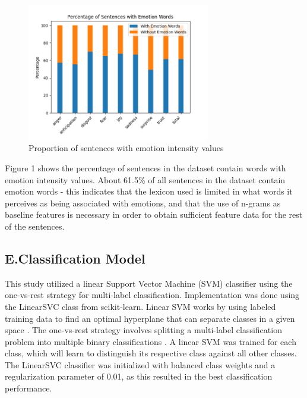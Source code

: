 \documentclass{icsthesis}
\begin{document}
\begin{mainmatter}
                \begin{figure}[h!]
                    \centering
                    \includegraphics[width=8cm]{./images/emopct.png}
                    \caption{Proportion of sentences with emotion intensity values}
                    \label{fig:chart}
                \end{figure}
                
                Figure 1 shows the percentage of sentences in the dataset contain words with emotion intensity values. About 61.5\% of all sentences in the dataset contain emotion words - this indicates that the lexicon used is limited in what words it perceives as being associated with emotions, and that the use of n-grams as baseline features is necessary in order to obtain sufficient feature data for the rest of the sentences.
                
            \subsection{E.\hspace{0.5cm}Classification Model}
                This study utilized a linear Support Vector Machine (SVM) classifier using the one-vs-rest strategy for multi-label classification. Implementation was done using the LinearSVC class from scikit-learn. Linear SVM works by using labeled training data to find an optimal hyperplane that can separate classes in a given space \citep{Shalev1}. The one-vs-rest strategy involves splitting a multi-label classification problem into multiple binary classifications \citep{Brownlee1}. A linear SVM was trained for each class, which will learn to distinguish its respective class against all other classes. The LinearSVC classifier was initialized with balanced class weights and a regularization parameter of 0.01, as this resulted in the best classification performance.
                

\end{mainmatter}
\end{document}
